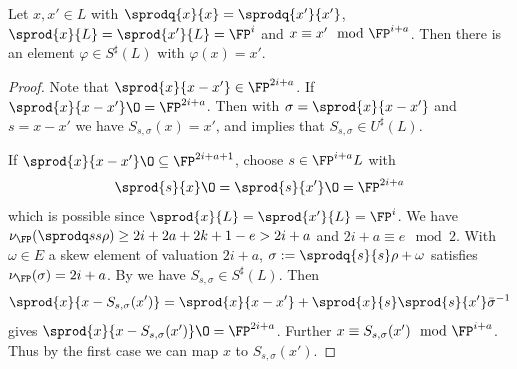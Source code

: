 %
%


\begin{lemma}\label{line}
 Let $x, x' \in L$ with $\sprodq{x}{x}=\sprodq{x'}{x'}$,
 $\sprod{x}{L}=\sprod{x'}{L}=\FP^i$ and $x \equiv x' \mod \FP^{i+a}$.
  Then there is an element $\varphi \in S^\sharp(L)$ with $\varphi(x) = x'$.
\end{lemma}
\begin{proof}
 Note that $\sprod{x}{x-x'} \in \FP^{2i+a}$.
  If $\sprod{x}{x-x'}\O =\FP^{2i+a}$. Then with $\sigma = \sprod{x}{x-x'}$ and $s = x - x'$ we have $S_{s, \sigma}(x) = x'$, and  implies that 
  $S_{s,\sigma} \in U^\sharp(L)$.

 If $\sprod{x}{x-x'}\O \subseteq \FP^{2i+a+1}$,
 choose $s \in \FP^{i+a}L$ with
 \[\sprod{s}{x}\O = \sprod{s}{x'}\O = \FP^{2i+a} \]
 which is possible since $\sprod{x}{L}=\sprod{x'}{L}=\FP^i$.
 We have $\nu_\FP(\sprodq s s \rho)\geq 2i+2a+2k+1-e > 2i + a$ and $2i+a \equiv e \mod 2$.
 With $\omega \in E$ a skew element of valuation $2i+a$, $\sigma := \sprodq{s}{s}\rho + \omega$ satisfies $\nu_\FP(\sigma)=2i+a$.
 By  we have
 $S_{s,\sigma} \in S^\sharp(L)$.
  Then \[\sprod{x}{x - S_{s,\sigma}(x')}=\sprod{x}{x-x'} + \sprod{x}{s}\sprod{s}{x'}\bar \sigma^{-1}\]
  gives $\sprod{x}{x - S_{s,\sigma}(x')}\O = \FP^{2i+a}$. Further $x \equiv S_{s,\sigma}(x') \mod \FP^{i+a}$. Thus by the first case we can map $x$ to $S_{s,\sigma}(x')$.
\end{proof}

